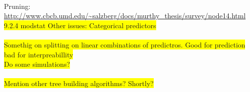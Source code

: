 \\ Pruning: \url{http://www.cbcb.umd.edu/~salzberg/docs/murthy_thesis/survey/node14.html}\\
\colorbox{yellow}{9.2.4 modstat Other issues: Categorical predictors} \\ \\
%
\colorbox{yellow}{Somethig on splitting on linear combinations of predictros. Good for prediction bad for interpreabillity}\\
\colorbox{yellow}{Do some simulations?}\\
\\\colorbox{yellow}{Mention other tree building algorithms? Shortly?}



